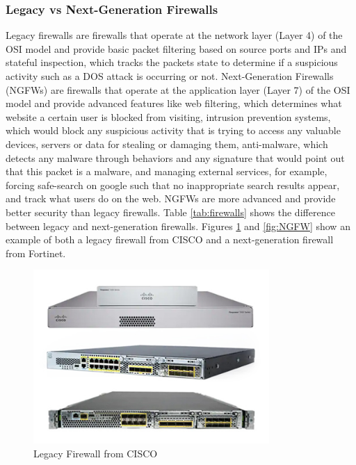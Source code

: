 \documentclass[12pt]{report}
\begin{document}
\subsubsection{Legacy vs Next-Generation Firewalls}
Legacy firewalls are firewalls that operate at the network layer (Layer 4) of the OSI model and provide basic packet filtering based on source ports and IPs and stateful inspection, which tracks the packets state to determine if a suspicious activity such as a DOS attack is occurring or not. Next-Generation Firewalls (NGFWs) are firewalls that operate at the application layer (Layer 7) of the OSI model and provide advanced features like web filtering, which determines what website a certain user is blocked from visiting, intrusion prevention systems, which would block any suspicious activity that is trying to access any valuable devices, servers or data for stealing or damaging them, anti-malware, which detects any malware through behaviors and any signature that would point out that this packet is a malware, and managing external services, for example, forcing safe-search on google such that no inappropriate search results appear, and track what users do on the web. NGFWs are more advanced and provide better security than legacy firewalls. Table \ref{tab:firewalls} shows the difference between legacy and next-generation firewalls. \cite{legtoNGFW}
Figures \ref{fig:legacyFW} and \ref{fig:NGFW} show an example of both a legacy firewall from CISCO and a next-generation firewall from Fortinet.

\begin{figure}[h]
    \centering
    \includegraphics[width=0.8\textwidth]{images/CiscoFW.jpg}
    \caption{Legacy Firewall from CISCO \cite{CFWIMG}}
    \label{fig:legacyFW}
\end{figure}
\end{document}
